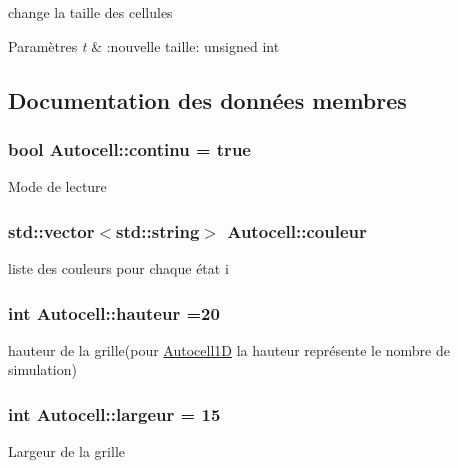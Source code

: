 change la taille des cellules 


\begin{DoxyParams}{Paramètres}
{\em t} & \+:nouvelle taille\+: unsigned int \\
\hline
\end{DoxyParams}


\subsection{Documentation des données membres}
\subsubsection[{\texorpdfstring{continu}{continu}}]{\setlength{\rightskip}{0pt plus 5cm}bool Autocell\+::continu = true\hspace{0.3cm}{\ttfamily [protected]}}\hypertarget{class_autocell_acd28f9a1e0654c9c365923828924b78a}{}\label{class_autocell_acd28f9a1e0654c9c365923828924b78a}
Mode de lecture 
\subsubsection[{\texorpdfstring{couleur}{couleur}}]{\setlength{\rightskip}{0pt plus 5cm}std\+::vector$<$std\+::string$>$ Autocell\+::couleur\hspace{0.3cm}{\ttfamily [protected]}}\hypertarget{class_autocell_a42cb133bcf58ca2f0e797d938fb79cc5}{}\label{class_autocell_a42cb133bcf58ca2f0e797d938fb79cc5}
liste des couleurs pour chaque état i 
\subsubsection[{\texorpdfstring{hauteur}{hauteur}}]{\setlength{\rightskip}{0pt plus 5cm}int Autocell\+::hauteur =20\hspace{0.3cm}{\ttfamily [protected]}}\hypertarget{class_autocell_a30f72e08777d91ecdd047ff5fa9b718f}{}\label{class_autocell_a30f72e08777d91ecdd047ff5fa9b718f}
hauteur de la grille(pour \hyperlink{class_autocell1_d}{Autocell1D} la hauteur représente le nombre de simulation) 
\subsubsection[{\texorpdfstring{largeur}{largeur}}]{\setlength{\rightskip}{0pt plus 5cm}int Autocell\+::largeur = 15\hspace{0.3cm}{\ttfamily [protected]}}\hypertarget{class_autocell_a7f7e3075befc2cae857ddbb9c4643ab7}{}\label{class_autocell_a7f7e3075befc2cae857ddbb9c4643ab7}
Largeur de la grille 
